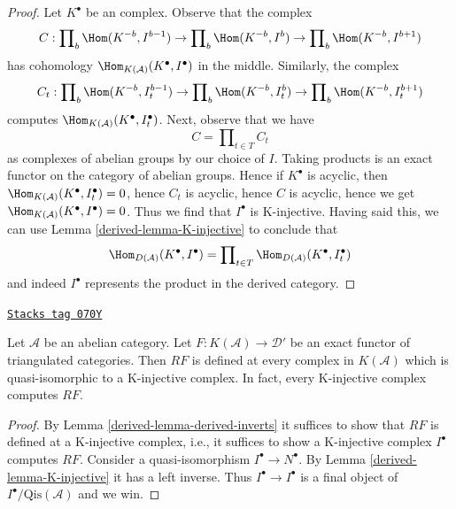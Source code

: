 \begin{proof}

Let $K^\bullet$ be an complex. Observe that the complex
$$
C :
\prod\nolimits_b \Hom(K^{-b}, I^{b - 1}) \to
\prod\nolimits_b \Hom(K^{-b}, I^b) \to
\prod\nolimits_b \Hom(K^{-b}, I^{b + 1})
$$
has cohomology $\Hom_{K(\mathcal{A})}(K^\bullet, I^\bullet)$
in the middle. Similarly, the complex
$$
C_t :
\prod\nolimits_b \Hom(K^{-b}, I_t^{b - 1}) \to
\prod\nolimits_b \Hom(K^{-b}, I_t^b) \to
\prod\nolimits_b \Hom(K^{-b}, I_t^{b + 1})
$$
computes $\Hom_{K(\mathcal{A})}(K^\bullet, I_t^\bullet)$.
Next, observe that we have
$$
C = \prod\nolimits_{t \in T} C_t
$$
as complexes of abelian groups by our choice of $I$.
Taking products is an exact functor on the
category of abelian groups. Hence if $K^\bullet$ is acyclic, then
$\Hom_{K(\mathcal{A})}(K^\bullet, I_t^\bullet) = 0$, hence
$C_t$ is acyclic, hence $C$ is acyclic, hence we get
$\Hom_{K(\mathcal{A})}(K^\bullet, I^\bullet) = 0$.
Thus we find that $I^\bullet$ is K-injective.
Having said this, we can use Lemma \ref{derived-lemma-K-injective}
to conclude that
$$
\Hom_{D(\mathcal{A})}(K^\bullet, I^\bullet)
=
\prod\nolimits_{t \in T} \Hom_{D(\mathcal{A})}(K^\bullet, I_t^\bullet)
$$
and indeed $I^\bullet$ represents the product in the derived category.
\end{proof}

\begin{lemma}
\label{derived-lemma-K-injective-defined}
\href{https://stacks.math.columbia.edu/tag/070Y}{\texttt{Stacks tag 070Y}}

Let $\mathcal{A}$ be an abelian category.
Let $F : K(\mathcal{A}) \to \mathcal{D}'$ be an exact functor
of triangulated categories. Then $RF$ is defined at every complex
in $K(\mathcal{A})$ which is quasi-isomorphic to a
K-injective complex. In fact, every K-injective complex computes $RF$.
\end{lemma}

\begin{proof}

By
Lemma \ref{derived-lemma-derived-inverts}
it suffices to show that $RF$ is defined at a K-injective complex,
i.e., it suffices to show a K-injective complex $I^\bullet$ computes $RF$.
Consider a quasi-isomorphism $I^\bullet \to N^\bullet$. By
Lemma \ref{derived-lemma-K-injective} it has a left inverse.
Thus $I^\bullet \to I^\bullet$ is a final object of
$I^\bullet/\text{Qis}(\mathcal{A})$ and we win.
\end{proof}

